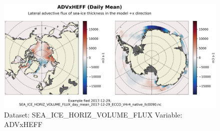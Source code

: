 \begin{figure}[H]
\centering
\includegraphics[width=\textwidth]{../images/plots/native_plots/Sea-Ice_and_Snow_Horizontal_Volume_Fluxes/ADVxHEFF.png}
\caption{Dataset: SEA\_ICE\_HORIZ\_VOLUME\_FLUX Variable: ADVxHEFF}
\label{tab:table-SEA_ICE_HORIZ_VOLUME_FLUX_ADVxHEFF-Plot}
\end{figure}
\pagebreak
